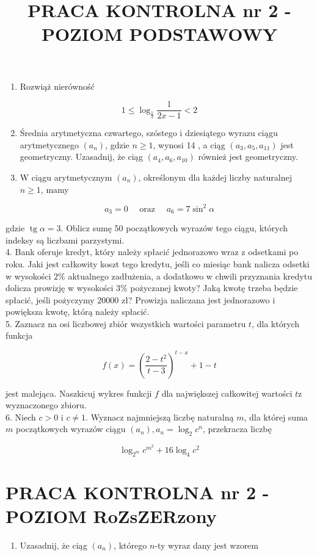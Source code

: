 \documentclass[10pt]{article}
\title{PRACA KONTROLNA nr 2 - POZIOM PODSTAWOWY }
\author{}
\date{}
\begin{document}
\maketitle
\begin{enumerate}
  \item Rozwiąż nierówność
\end{enumerate}

$$
1 \leqslant \log _{\frac{1}{3}} \frac{1}{2 x-1}<2
$$

\begin{enumerate}
  \setcounter{enumi}{1}
  \item Średnia arytmetyczna czwartego, szóstego i dziesiątego wyrazu ciągu arytmetycznego $\left(a_{n}\right)$, gdzie $n \geqslant 1$, wynosi 14 , a ciąg $\left(a_{3}, a_{5}, a_{11}\right)$ jest geometryczny. Uzasadnij, że ciąg $\left(a_{4}, a_{6}, a_{10}\right)$ również jest geometryczny.
  \item W ciągu arytmetycznym $\left(a_{n}\right)$, określonym dla każdej liczby naturalnej $n \geqslant 1$, mamy
\end{enumerate}

$$
a_{3}=0 \quad \text { oraz } \quad a_{6}=7 \sin ^{2} \alpha
$$

gdzie $\operatorname{tg} \alpha=3$. Oblicz sumę 50 początkowych wyrazów tego ciągu, których indeksy są liczbami parzystymi.\\
4. Bank oferuje kredyt, który należy spłacić jednorazowo wraz z odsetkami po roku. Jaki jest całkowity koszt tego kredytu, jeśli co miesiąc bank nalicza odsetki w wysokości $2 \%$ aktualnego zadłużenia, a dodatkowo w chwili przyznania kredytu dolicza prowizję w wysokości $3 \%$ pożyczanej kwoty? Jaką kwotę trzeba będzie spłacić, jeśli pożyczymy 20000 zł? Prowizja naliczana jest jednorazowo i powiększa kwotę, którą należy spłacić.\\
5. Zaznacz na osi liczbowej zbiór wszystkich wartości parametru $t$, dla których funkcja

$$
f(x)=\left(\frac{2-t^{2}}{t-3}\right)^{t-x}+1-t
$$

jest malejąca. Naszkicuj wykres funkcji $f$ dla największej całkowitej wartości $t \mathrm{z}$ wyznaczonego zbioru.\\
6. Niech $c>0$ i $c \neq 1$. Wyznacz najmniejszą liczbę naturalną $m$, dla której suma $m$ początkowych wyrazów ciągu $\left(a_{n}\right), a_{n}=\log _{2} c^{n}$, przekracza liczbę

$$
\log _{2^{m}} c^{m^{2}}+16 \log _{4} c^{2}
$$

\section*{PRACA KONTROLNA nr 2 - POZIOM RoZsZERzony}
\begin{enumerate}
  \item Uzasadnij, że ciąg $\left(a_{n}\right)$, którego $n$-ty wyraz dany jest wzorem
\end{enumerate}
\end{document}
